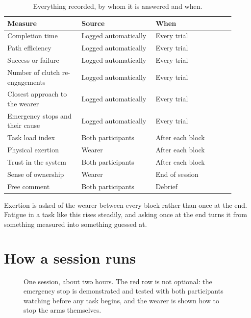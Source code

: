 \begin{table}[htbp]
  \centering
  \small
  \caption[Measures]{Everything recorded, by whom it is answered and when.}
  \label{tab:measures}
  \begin{tabular}{@{}p{0.30\linewidth}p{0.30\linewidth}p{0.32\linewidth}@{}}
    \toprule
    \textbf{Measure} & \textbf{Source} & \textbf{When} \\
    \midrule
    Completion time & Logged automatically & Every trial \\
    Path efficiency & Logged automatically & Every trial \\
    Success or failure & Logged automatically & Every trial \\
    Number of clutch re-engagements & Logged automatically & Every trial \\
    Closest approach to the wearer & Logged automatically & Every trial \\
    Emergency stops and their cause & Logged automatically & Every trial \\
    Task load index~\cite{hart1988nasatlx} & Both participants & After each
      block \\
    Physical exertion~\cite{borg1982perceived} & Wearer & After each block \\
    Trust in the system & Both participants & After each block \\
    Sense of ownership~\cite{longo2008embodiment} & Wearer & End of session \\
    Free comment & Both participants & Debrief \\
    \bottomrule
  \end{tabular}
\end{table}

Exertion is asked of the wearer between every block rather than once at the
end. Fatigue in a task like this rises steadily, and asking once at the end
turns it from something measured into something guessed at.

\section{How a session runs}

\begin{figure}[htbp]
  \centering
  
  \caption[A session]{One session, about two hours. The red row is not
  optional: the emergency stop is demonstrated and tested with both
  participants watching before any task begins, and the wearer is shown how to
  stop the arms themselves.}
  \label{fig:session}
\end{figure}

